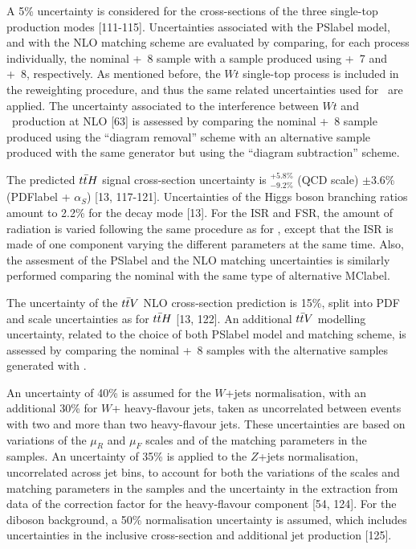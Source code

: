 A 5\% uncertainty is considered for the cross-sections of the three single-top production modes [111-115]. Uncertainties associated with the \acrshort{PSlabel} model, and with the NLO matching scheme are evaluated by comparing, for each process individually, the nominal \POWHEGBOX+\PYTHIA~8 sample with a sample produced using \POWHEGBOX+\HERWIG~7 and \MGMCatNLO+\PYTHIA~8, respectively. As mentioned before, the $Wt$ single-top process is included in the reweighting procedure, and thus the same related uncertainties used for \ttbar\ are applied. The uncertainty associated to the interference between $Wt$ and \ttbar\ production at NLO [63] is assessed by comparing the nominal \POWHEGBOX+\PYTHIA~8 sample produced using the “diagram removal” scheme with an alternative sample produced with the same generator but using the “diagram subtraction” scheme.

The predicted $t\bar{t} H$ signal cross-section uncertainty is $^{+5.8\%}_{-9.2\%}$ (QCD scale) $\pm$3.6\% (\acrshort{PDFlabel} + $\alpha_S$) [13, 117-121]. Uncertainties of the Higgs boson branching ratios amount to 2.2\% for the \bbar decay mode [13]. For the ISR and FSR, the amount of radiation is varied following the same procedure as for \ttbar, except that the ISR is made of one component varying the different parameters at the same time. Also, the assesment of the \acrshort{PSlabel} and the NLO matching uncertainties is similarly performed comparing the nominal with the same type of alternative \acrshort{MClabel}.

The uncertainty of the $t\bar{t} V$ NLO cross-section prediction is 15\%, split into PDF and scale uncertainties as for $t\bar{t} H$ [13, 122]. An additional $t\bar{t} V$ modelling uncertainty, related to the choice of both \acrshort{PSlabel} model and matching scheme, is assessed by comparing the nominal \MGMCatNLO+\PYTHIA~8 samples with the alternative samples generated with \SHERPA.

An uncertainty of 40\% is assumed for the $W$+jets normalisation, with an additional 30\% for $W$+ heavy-flavour jets, taken as uncorrelated between events with two and more than two heavy-flavour jets. These uncertainties are based on variations of the $\mu_R$ and $\mu_F$ scales and of the matching parameters in the \SHERPA samples. An uncertainty of 35\% is applied to the $Z$+jets normalisation, uncorrelated across jet bins, to account for both the variations of the scales and matching parameters in the \SHERPA samples and the uncertainty in the extraction from data of the correction factor for the heavy-flavour
component [54, 124]. For the diboson background, a 50\% normalisation uncertainty is assumed, which includes uncertainties in the inclusive cross-section and additional jet production [125].

